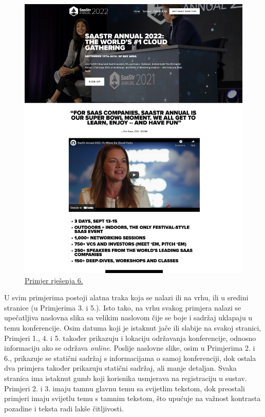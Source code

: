 \begin{figure}[H]
\begin{minipage}[t]{0.4\textwidth}
				\includegraphics[width=\linewidth]{slike/frontpage_example6}
				\caption{\href{https://www.saastrannual2022.com//}{Primjer rješenja 6.}} \label{fig:frontpage_example6}
			\end{minipage}
		\end{figure}
		
		U svim primjerima postoji alatna traka koja se nalazi ili na vrhu, ili u sredini stranice (u Primjerima 3. i 5.). Isto tako, na vrhu svakog primjera nalazi se upečatljiva naslovna slika sa velikim naslovom čije se boje i sadržaj uklapaju u temu konferencije. Osim datuma koji je istaknut jače ili slabije na svakoj stranici, Primjeri 1., 4. i 5. također prikazuju i lokaciju održavanja konferencije, odnosno informaciju ako se održava \textit{online}. Poslije naslovne slike, osim u Primjerima 2. i 6., prikazuje se statični sadržaj s informacijama o samoj konferenciji, dok ostala dva primjera također prikazuju statični sadržaj, ali manje detaljan. Svaka stranica ima istaknut gumb koji korisnika usmjerava na registraciju u sustav. Primjeri 2. i 3. imaju tamnu glavnu temu sa svijetlim tekstom, dok preostali primjeri imaju svijetlu temu s tamnim tekstom, što upućuje na važnost kontrasta pozadine i teksta radi lakše čitljivosti. 
			
		\eject
		
	